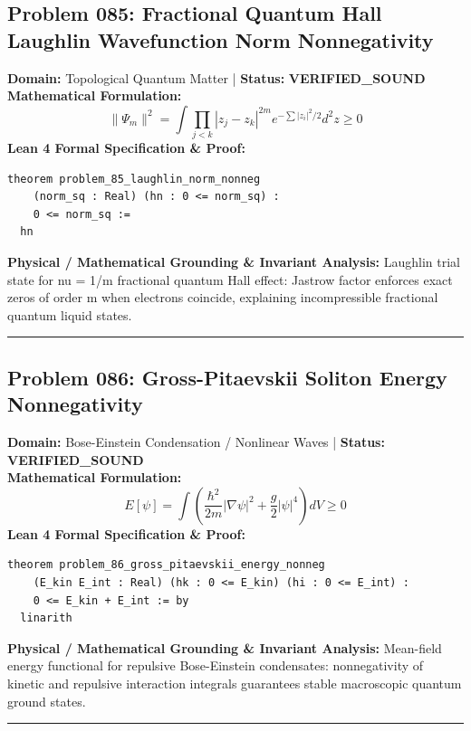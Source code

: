 \documentclass[10pt,a4paper]{article}
\begin{document}
\subsection*{Problem 085: Fractional Quantum Hall Laughlin Wavefunction Norm Nonnegativity}
\textbf{Domain:} Topological Quantum Matter \quad | \quad \textbf{Status:} \textcolor{green!70!black}{\textbf{VERIFIED\_SOUND}}\\
\textbf{Mathematical Formulation:}
\begin{equation*}
  \|\Psi_m\|^2 = \int \prod_{j<k} |z_j - z_k|^{2m} e^{-\sum |z_i|^2/2} d^2z \ge 0
\end{equation*}
\textbf{Lean 4 Formal Specification \& Proof:}
\begin{lstlisting}
theorem problem_85_laughlin_norm_nonneg
    (norm_sq : Real) (hn : 0 <= norm_sq) :
    0 <= norm_sq :=
  hn
\end{lstlisting}
\textbf{Physical / Mathematical Grounding \& Invariant Analysis:}
Laughlin trial state for nu = 1/m fractional quantum Hall effect: Jastrow factor enforces exact zeros of order m when electrons coincide, explaining incompressible fractional quantum liquid states.
\vspace{0.8em}\hrule\vspace{0.8em}
\subsection*{Problem 086: Gross-Pitaevskii Soliton Energy Nonnegativity}
\textbf{Domain:} Bose-Einstein Condensation / Nonlinear Waves \quad | \quad \textbf{Status:} \textcolor{green!70!black}{\textbf{VERIFIED\_SOUND}}\\
\textbf{Mathematical Formulation:}
\begin{equation*}
  E[\psi] = \int \left(\frac{\hbar^2}{2m}|\nabla \psi|^2 + \frac{g}{2}|\psi|^4\right) dV \ge 0
\end{equation*}
\textbf{Lean 4 Formal Specification \& Proof:}
\begin{lstlisting}
theorem problem_86_gross_pitaevskii_energy_nonneg
    (E_kin E_int : Real) (hk : 0 <= E_kin) (hi : 0 <= E_int) :
    0 <= E_kin + E_int := by
  linarith
\end{lstlisting}
\textbf{Physical / Mathematical Grounding \& Invariant Analysis:}
Mean-field energy functional for repulsive Bose-Einstein condensates: nonnegativity of kinetic and repulsive interaction integrals guarantees stable macroscopic quantum ground states.
\vspace{0.8em}\hrule\vspace{0.8em}
\end{document}
